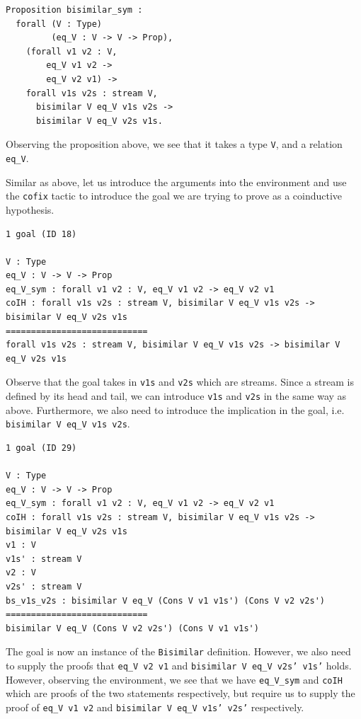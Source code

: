 \documentclass{article}
\begin{document}
\begin{lstlisting}
Proposition bisimilar_sym :
  forall (V : Type)
         (eq_V : V -> V -> Prop),
    (forall v1 v2 : V,
        eq_V v1 v2 ->
        eq_V v2 v1) ->
    forall v1s v2s : stream V,
      bisimilar V eq_V v1s v2s ->
      bisimilar V eq_V v2s v1s.
\end{lstlisting}

Observing the proposition above, we see that it takes a type \texttt{V}, and a relation \texttt{eq\_V}.

Similar as above, let us introduce the arguments into the environment and use the \texttt{cofix} tactic to introduce the goal we are trying to prove as a coinductive hypothesis.

\begin{lstlisting}
1 goal (ID 18)

V : Type
eq_V : V -> V -> Prop
eq_V_sym : forall v1 v2 : V, eq_V v1 v2 -> eq_V v2 v1
coIH : forall v1s v2s : stream V, bisimilar V eq_V v1s v2s -> bisimilar V eq_V v2s v1s
============================
forall v1s v2s : stream V, bisimilar V eq_V v1s v2s -> bisimilar V eq_V v2s v1s
\end{lstlisting}

Observe that the goal takes in \texttt{v1s} and \texttt{v2s} which are streams. Since a stream is defined by its head and tail, we can introduce \texttt{v1s} and \texttt{v2s} in the same way as above. Furthermore, we also need to introduce the implication in the goal, i.e. \texttt{bisimilar V eq\_V v1s v2s}.

\begin{lstlisting}
1 goal (ID 29)

V : Type
eq_V : V -> V -> Prop
eq_V_sym : forall v1 v2 : V, eq_V v1 v2 -> eq_V v2 v1
coIH : forall v1s v2s : stream V, bisimilar V eq_V v1s v2s -> bisimilar V eq_V v2s v1s
v1 : V
v1s' : stream V
v2 : V
v2s' : stream V
bs_v1s_v2s : bisimilar V eq_V (Cons V v1 v1s') (Cons V v2 v2s')
============================
bisimilar V eq_V (Cons V v2 v2s') (Cons V v1 v1s')
\end{lstlisting}

The goal is now an instance of the \texttt{Bisimilar} definition. However, we also need to supply the proofs that \texttt{eq\_V v2 v1} and \texttt{bisimilar V eq\_V v2s' v1s'} holds. However, observing the environment, we see that we have \texttt{eq\_V\_sym} and \texttt{coIH} which are proofs of the two statements respectively, but require us to supply the proof of \texttt{eq\_V v1 v2} and \texttt{bisimilar V eq\_V v1s' v2s'} respectively.
\end{document}

